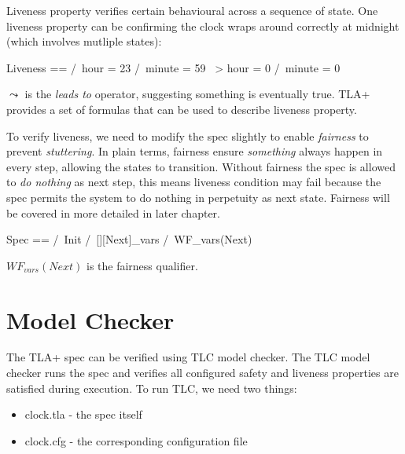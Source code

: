 \documentclass{report}
\begin{document}
Liveness property verifies certain behavioural across a sequence of state. One
liveness property can be confirming the clock wraps around correctly at
midnight (which involves mutliple states): \newline

\begin{tla}
    Liveness ==
        /\ hour = 23 /\ minute = 59 ~> hour = 0 /\ minute = 0
\end{tla}
\begin{tlatex}
%
\end{tlatex}
\newline

$\leadsto$ is the \textit{leads to} operator, suggesting something is eventually
true. TLA+ provides a set of formulas that can be used to describe liveness
property.\newline 

To verify liveness, we need to modify the spec slightly to enable
\textit{fairness} to prevent \textit{stuttering}. In plain terms, fairness
ensure \textit{something} always happen in every step, allowing the states to
transition. Without fairness the spec is allowed to \textit{do nothing} as next
step, this means liveness condition may fail because the spec permits the system
to do nothing in perpetuity as next state. Fairness will be covered in more
detailed in later chapter.\newline

\begin{tla}
    Spec ==
        /\ Init
        /\ [][Next]_vars
        /\ WF_vars(Next)
\end{tla}
\begin{tlatex}
%
%
%
%
\end{tlatex}
\newline

$WF_{vars}(Next)$ is the fairness qualifier.


\section{Model Checker}

The TLA+ spec can be verified using TLC model checker. The TLC model checker
runs the spec and verifies all configured safety and liveness properties are
satisfied during execution. To run TLC, we need two things:
\begin{itemize}
    \item clock.tla - the spec itself
    \item clock.cfg - the corresponding configuration file
\end{itemize}
\end{document}
